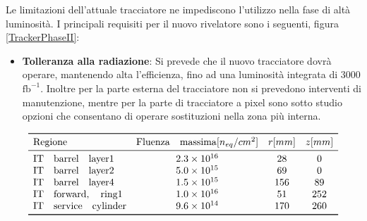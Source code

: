 Le limitazioni dell'attuale tracciatore ne impediscono l'utilizzo nella fase di altà luminosità. I principali requisiti per il nuovo rivelatore sono i seguenti, figura \ref{TrackerPhaseII}:

\begin{itemize}
\item \textbf{Tolleranza alla radiazione}: Si prevede che il nuovo tracciatore dovrà operare, mantenendo alta l'efficienza, fino ad una luminosità integrata di 3000 $\mathrm{fb^{-1}}$. Inoltre per la parte esterna del tracciatore non si prevedono interventi di manutenzione, mentre per la parte di tracciatore a pixel sono sotto studio opzioni che consentano di operare sostituzioni nella zona più interna. 
\end{itemize}

\[
\begin{array}{lccc}

\toprule
\mathrm{Regione} & \mathrm{Fluenza \quad massima} [n_{eq}/cm^2] & r [mm] & z[mm]  \\

\midrule

\mathrm{IT \quad barrel \quad layer 1} & 2.3\times10^{16} & 28 & 0\\

\mathrm{IT\quad barrel\quad layer 2} & 5.0\times10^{15} & 69 & 0\\

\mathrm{IT\quad barrel\quad layer 4} & 1.5\times10^{15} & 156 & 89\\

\mathrm{IT\quad forward,\quad ring 1} & 1.0\times10^{16} & 51 & 252\\

\mathrm{IT\quad service\quad cylinder} & 9.6\times10^{14} & 170 & 260\\

\bottomrule
\end{array}
\]

